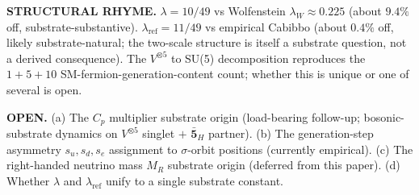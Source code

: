 \documentclass[11pt,reqno]{amsart}
\theoremstyle{plain}
\theoremstyle{definition}
\theoremstyle{remark}
\newcommand{\barrep}[1]{\bar{\mathbf{#1}}}
\begin{document}
\noindent\textbf{STRUCTURAL RHYME.} $\lambda = 10/49$ vs
Wolfenstein $\lambda_W \approx 0.225$ (about $9.4\%$ off,
substrate-substantive). $\lambda_{\mathrm{ref}} = 11/49$ vs
empirical Cabibbo (about $0.4\%$ off, likely
substrate-natural; the two-scale structure is itself a
substrate question, not a derived consequence). The
$V^{\otimes 5}$ to SU(5) decomposition reproduces the
$1+5+10$ SM-fermion-generation-content count; whether this
is unique or one of several is open.

\noindent\textbf{OPEN.} (a) The $C_p$ multiplier substrate
origin (load-bearing follow-up; bosonic-substrate dynamics
on $V^{\otimes 5}$ singlet $+$ $\barrep{5}_H$ partner). (b)
The generation-step asymmetry $s_u, s_d, s_e$ assignment
to $\sigma$-orbit positions (currently empirical). (c) The
right-handed neutrino mass $M_R$ substrate origin (deferred
from this paper). (d) Whether $\lambda$ and
$\lambda_{\mathrm{ref}}$ unify to a single substrate constant.
\end{document}
